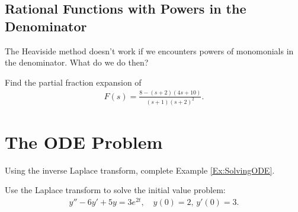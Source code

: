 \documentclass[12pt,a4paper]{article}
\newcounter{example}[section]
\begin{document}
	\vspace*{16pt}
	
	\begin{comment}
	\begin{example}
	Write in partial fractions the following rational function:
		\begin{align*}
		F(s) = \frac{s^2 + 1}{s^3 - s} .
		\end{align*}
	\end{example}
	\end{comment}
	
	\newpage
	
	\subsection{Rational Functions with Powers in the Denominator}
	The Heaviside method doesn't work if we encounters powers of monomonials in the denominator. What do we do then?
	
	\vspace*{16pt}
	
	\begin{example}
	Find the partial fraction expansion of
		\begin{align*}
		F(s) = \frac{8 - (s + 2) (4s + 10)}{(s + 1) (s + 2)^2} .
		\end{align*}
	\end{example}
	
	\newpage
	
	\section{The ODE Problem}
	
	\begin{example}
	Using the inverse Laplace transform, complete Example \ref{Ex:SolvingODE}.
	\end{example}
	
	\newpage
	
	\begin{example}
	Use the Laplace transform to solve the initial value problem:
		\begin{align*}
		y'' - 6y' + 5y = 3e^{2t} , \quad y(0) = 2 , \, y' (0) = 3 .
		\end{align*}
	\end{example}
	
	\newpage
	
	\phantom{2}
\end{document}
